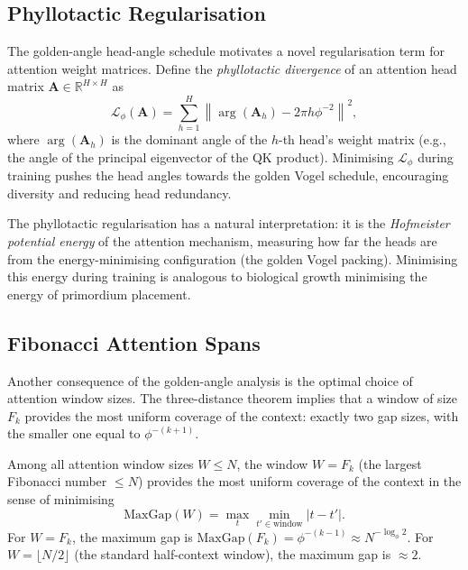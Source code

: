 \subsection{Phyllotactic Regularisation}
\label{subsec:phyllo-regularise}

The golden-angle head-angle schedule motivates a novel regularisation
term for attention weight matrices.  Define the
\emph{phyllotactic divergence} of an attention head matrix $\mathbf{A}
\in \mathbb{R}^{H \times H}$ as
\[
  \mathcal{L}_\phi(\mathbf{A}) = \sum_{h=1}^{H} \left\|
    \arg(\mathbf{A}_h) - 2\pi h\phi^{-2} \right\|^2,
\]
where $\arg(\mathbf{A}_h)$ is the dominant angle of the $h$-th head's
weight matrix (e.g., the angle of the principal eigenvector of the QK
product).  Minimising $\mathcal{L}_\phi$ during training pushes the
head angles towards the golden Vogel schedule, encouraging
diversity and reducing head redundancy.

The phyllotactic regularisation has a natural interpretation: it is
the \emph{Hofmeister potential energy} of the attention mechanism,
measuring how far the heads are from the energy-minimising
configuration (the golden Vogel packing).  Minimising this energy
during training is analogous to biological growth minimising the
energy of primordium placement.

\subsection{Fibonacci Attention Spans}
\label{subsec:fibonacci-spans}

Another consequence of the golden-angle analysis is the optimal choice
of attention window sizes.  The three-distance theorem implies that a
window of size $F_k$ provides the most uniform coverage of the context:
exactly two gap sizes, with the smaller one equal to $\phi^{-(k+1)}$.

\begin{proposition}\label{prop:attention-window}
Among all attention window sizes $W \leq N$, the window $W = F_k$
(the largest Fibonacci number $\leq N$) provides the most uniform
coverage of the context in the sense of minimising
\[
  \text{MaxGap}(W) = \max_{t} \min_{t' \in \text{window}} |t - t'|.
\]
For $W = F_k$, the maximum gap is $\text{MaxGap}(F_k) = \phi^{-(k-1)} \approx N^{-\log_\phi 2}$.
For $W = \lfloor N/2 \rfloor$ (the standard half-context window),
the maximum gap is $\approx 2$.
\end{proposition}

